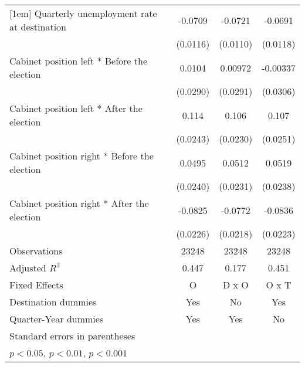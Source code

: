 \begin{table}[htbp]
\begin{tabular}{l*{3}{c}}
[1em]
Quarterly unemployment rate at destination&     -0.0709\sym{***}&     -0.0721\sym{***}&     -0.0691\sym{***}\\
                    &    (0.0116)         &    (0.0110)         &    (0.0118)         \\
[1em]
Cabinet position left * Before the election&      0.0104         &     0.00972         &    -0.00337         \\
                    &    (0.0290)         &    (0.0291)         &    (0.0306)         \\
[1em]
Cabinet position left * After the election&       0.114\sym{***}&       0.106\sym{***}&       0.107\sym{***}\\
                    &    (0.0243)         &    (0.0230)         &    (0.0251)         \\
[1em]
Cabinet position right * Before the election&      0.0495\sym{*}  &      0.0512\sym{*}  &      0.0519\sym{*}  \\
                    &    (0.0240)         &    (0.0231)         &    (0.0238)         \\
[1em]
Cabinet position right * After the election&     -0.0825\sym{***}&     -0.0772\sym{***}&     -0.0836\sym{***}\\
                    &    (0.0226)         &    (0.0218)         &    (0.0223)         \\
\hline
Observations        &       23248         &       23248         &       23248         \\
Adjusted \(R^{2}\)  &       0.447         &       0.177         &       0.451         \\
Fixed Effects       &           O         &       D x O         &       O x T         \\
Destination dummies &         Yes         &          No         &         Yes         \\
Quarter-Year dummies&         Yes         &         Yes         &          No         \\
\hline\hline
\multicolumn{4}{l}{\footnotesize Standard errors in parentheses}\\
\multicolumn{4}{l}{\footnotesize \sym{*} \(p<0.05\), \sym{**} \(p<0.01\), \sym{***} \(p<0.001\)}\\
\end{tabular}
\end{table}
